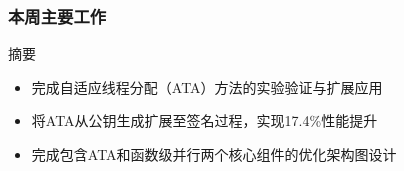\documentclass[slide]{../../custom}
\begin{document}
\begin{frame}
  \titlepage
\end{frame}

\begin{frame}
  \frametitle{本周主要工作}
  \begin{block}{摘要}
    \begin{itemize}
      \item 完成自适应线程分配（ATA）方法的实验验证与扩展应用
      \item 将ATA从公钥生成扩展至签名过程，实现17.4\%性能提升
      \item 完成包含ATA和函数级并行两个核心组件的优化架构图设计
    \end{itemize}
  \end{block}
\end{frame}
\end{document}
